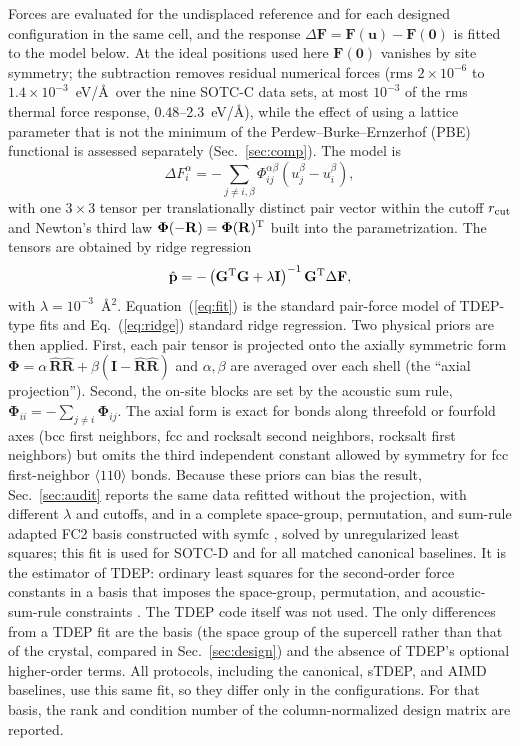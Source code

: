 \documentclass[aip,jap,reprint,amsmath,amssymb,floatfix]{revtex4-2}
\begin{document}
Forces are evaluated for the undisplaced reference and for each designed
configuration in the same cell, and the response
$\Delta\mathbf F=\mathbf F(\mathbf u)-\mathbf F(\mathbf 0)$ is fitted to
the model below. At the ideal positions used here $\mathbf F(\mathbf 0)$
vanishes by site symmetry; the subtraction removes residual numerical forces
(rms $2\times10^{-6}$ to $1.4\times10^{-3}$~eV/\AA\ over the nine SOTC-C
data sets, at most $10^{-3}$ of the rms thermal force response, 0.48--2.3~eV/\AA),
while the effect of using a lattice parameter that is not the minimum of the
Perdew--Burke--Ernzerhof (PBE) functional is
assessed separately (Sec.~\ref{sec:comp}). The model is
\begin{equation}
\Delta F_i^\alpha=-\sum_{j\ne i,\beta}\Phi_{ij}^{\alpha\beta}
\left(u_j^\beta-u_i^\beta\right),
\label{eq:fit}
\end{equation}
with one $3\times3$ tensor per translationally distinct pair vector within the
cutoff $r_{\rm cut}$ and Newton's third law
$\boldsymbol\Phi(-\mathbf R)=\boldsymbol\Phi(\mathbf R)^{\rm T}$ built into the
parametrization. The tensors are obtained by ridge regression
\begin{equation}
\hat{\mathbf p}=-\left(\mathbf G^{\rm T}\mathbf G+\lambda\mathbf I\right)^{-1}
\mathbf G^{\rm T}\Delta\mathbf F,
\label{eq:ridge}
\end{equation}
with $\lambda=10^{-3}$~\AA$^2$. Equation~(\ref{eq:fit}) is the standard
pair-force model of TDEP-type fits \cite{ref5} and Eq.~(\ref{eq:ridge}) standard
ridge regression. Two physical priors are then applied.
First, each pair tensor is projected onto the axially symmetric form
$\boldsymbol\Phi=\alpha\,\hat{\mathbf R}\hat{\mathbf R}+\beta(\mathbf I-\hat{\mathbf R}\hat{\mathbf R})$
and $\alpha,\beta$ are averaged over each shell (the ``axial projection'').
Second, the on-site blocks are set by the acoustic sum rule,
$\boldsymbol\Phi_{ii}=-\sum_{j\ne i}\boldsymbol\Phi_{ij}$. The axial form is
exact for bonds along threefold or fourfold axes (bcc first neighbors, fcc and
rocksalt second neighbors, rocksalt first neighbors) but omits the third
independent constant allowed by symmetry for fcc first-neighbor $\langle110\rangle$
bonds. Because these priors can bias the result, Sec.~\ref{sec:audit} reports
the same data refitted without the projection, with different $\lambda$ and
cutoffs, and in a complete space-group, permutation, and sum-rule adapted FC2
basis constructed with symfc \cite{ref54}, solved by unregularized least
squares; this fit is used for SOTC-D and for all matched canonical baselines. It is the estimator of TDEP: ordinary least squares for the
second-order force constants in a basis that imposes the space-group,
permutation, and acoustic-sum-rule constraints \cite{ref5}. The TDEP code
itself was not used. The only differences from a TDEP fit are the basis (the
space group of the supercell rather than that of the crystal, compared in
Sec.~\ref{sec:design}) and the absence of TDEP's optional higher-order terms.
All protocols, including the canonical, sTDEP, and AIMD baselines, use this
same fit, so they differ only in the configurations.
For that basis, the rank and condition number of the column-normalized
design matrix are reported.
\end{document}
